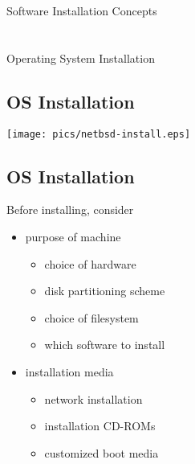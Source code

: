 \documentclass[xga]{xdvislides}
\begin{document}
\newpage
\vspace*{\fill}
\begin{center}
	\Hugesize
		Software Installation Concepts \\ [1em]
	\hspace*{5mm}
	\blueline\\
	\hspace*{5mm}\\
		Operating System Installation
\end{center}
\vspace*{\fill}


\subsection{OS Installation}
\begin{center}
	\texttt{[image: pics/netbsd-install.eps]}
\end{center}

\subsection{OS Installation}
Before installing, consider
\begin{itemize}
	\item purpose of machine
		\begin{itemize}
			\item choice of hardware
			\item disk partitioning scheme
			\item choice of filesystem
			\item which software to install
		\end{itemize}
	\item installation media
		\begin{itemize}
			\item network installation
			\item installation CD-ROMs
			\item customized boot media
		\end{itemize}
\end{itemize}
\end{document}
